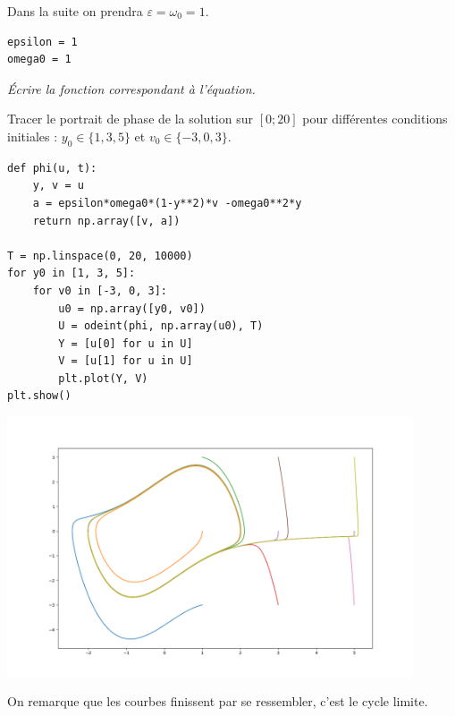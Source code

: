 Dans la suite on prendra $\varepsilon = \omega_0=1$.
\textbf{}\begin{lstlisting}
epsilon = 1
omega0 = 1
\end{lstlisting}
\begin{Exercise}\it
Écrire la fonction  correspondant à l'équation.

Tracer le portrait de phase de la solution sur $[0;20]$ pour différentes conditions initiales : 
$y_0 \in \{1, 3, 5\}$ et $ v_0 \in \{-3, 0, 3\}$. 
\end{Exercise}
\begin{Answer}
\begin{lstlisting}
def phi(u, t):
    y, v = u
    a = epsilon*omega0*(1-y**2)*v -omega0**2*y
    return np.array([v, a])

T = np.linspace(0, 20, 10000)
for y0 in [1, 3, 5]:
    for v0 in [-3, 0, 3]:
        u0 = np.array([y0, v0])
        U = odeint(phi, np.array(u0), T)
        Y = [u[0] for u in U]
        V = [u[1] for u in U]
        plt.plot(Y, V)
plt.show()
\end{lstlisting}
\begin{center}
\includegraphics[width=12cm]{TP/Images/ED2_vdp_cycle.png}
\end{center}
\end{Answer}
On remarque que les courbes finissent par se ressembler, c'est le cycle limite.
